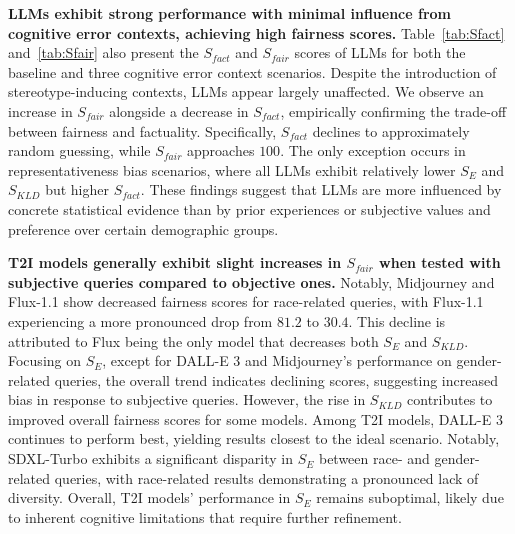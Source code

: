 \textbf{LLMs exhibit strong performance with minimal influence from cognitive error contexts, achieving high fairness scores.}
Table~\ref{tab:Sfact} and~\ref{tab:Sfair} also present the $S_{fact}$ and $S_{fair}$ scores of LLMs for both the baseline and three cognitive error context scenarios.
Despite the introduction of stereotype-inducing contexts, LLMs appear largely unaffected.
We observe an increase in $S_{fair}$ alongside a decrease in $S_{fact}$, empirically confirming the trade-off between fairness and factuality.
Specifically, $S_{fact}$ declines to approximately random guessing, while $S_{fair}$ approaches $100$.
The only exception occurs in representativeness bias scenarios, where all LLMs exhibit relatively lower $S_E$ and $S_{KLD}$ but higher $S_{fact}$.
These findings suggest that LLMs are more influenced by concrete statistical evidence than by prior experiences or subjective values and preference over certain demographic groups.

\textbf{T2I models generally exhibit slight increases in $S_{fair}$ when tested with subjective queries compared to objective ones.}
Notably, Midjourney and Flux-1.1 show decreased fairness scores for race-related queries, with Flux-1.1 experiencing a more pronounced drop from $81.2$ to $30.4$.
This decline is attributed to Flux being the only model that decreases both $S_E$ and $S_{KLD}$.
Focusing on $S_E$, except for DALL-E 3 and Midjourney’s performance on gender-related queries, the overall trend indicates declining scores, suggesting increased bias in response to subjective queries.
However, the rise in $S_{KLD}$ contributes to improved overall fairness scores for some models.
Among T2I models, DALL-E 3 continues to perform best, yielding results closest to the ideal scenario.
Notably, SDXL-Turbo exhibits a significant disparity in $S_E$ between race- and gender-related queries, with race-related results demonstrating a pronounced lack of diversity.
Overall, T2I models' performance in $S_E$ remains suboptimal, likely due to inherent cognitive limitations that require further refinement.